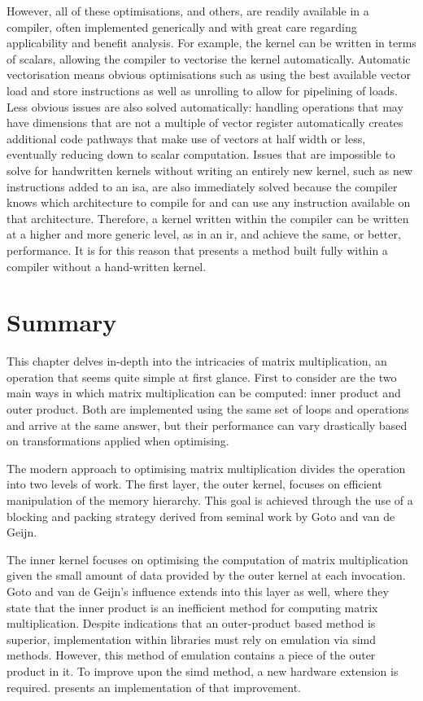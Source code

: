 \documentclass[\main/thesis.tex]{subfiles}
\begin{document}
However, all of these optimisations, and others, are readily available in a compiler, often implemented generically and with great care regarding applicability and benefit analysis.
For example, the kernel can be written in terms of scalars, allowing the compiler to vectorise the kernel automatically.
Automatic vectorisation means obvious optimisations such as using the best available vector load and store instructions as well as unrolling to allow for pipelining of loads.
Less obvious issues are also solved automatically: handling operations that may have dimensions that are not a multiple of vector register automatically creates additional code pathways that make use of vectors at half width or less, eventually reducing down to scalar computation.
Issues that are impossible to solve for handwritten kernels without writing an entirely new kernel, such as new instructions added to an \gls{isa}, are also immediately solved because the compiler knows which architecture to compile for and can use any instruction available on that architecture.
Therefore, a kernel written within the compiler can be written at a higher and more generic level, as in an \gls{ir}, and achieve the same, or better, performance.
It is for this reason that  presents a method built fully within a compiler without a hand-written kernel.

\section{Summary}
This chapter delves in-depth into the intricacies of matrix multiplication, an operation that seems quite simple at first glance.
First to consider are the two main ways in which matrix multiplication can be computed: inner product and outer product.
Both are implemented using the same set of loops and operations and arrive at the same answer, but their performance can vary drastically based on transformations applied when optimising.

The modern approach to optimising matrix multiplication divides the operation into two levels of work.
The first layer, the outer kernel, focuses on efficient manipulation of the memory hierarchy.
This goal is achieved through the use of a blocking and packing strategy derived from seminal work by Goto and van de Geijn.

The inner kernel focuses on optimising the computation of matrix multiplication given the small amount of data provided by the outer kernel at each invocation.
Goto and van de Geijn's influence extends into this layer as well, where they state that the inner product is an inefficient method for computing matrix multiplication.
Despite indications that an outer-product based method is superior, implementation within libraries must rely on emulation via \gls{simd} methods.
However, this method of emulation contains a piece of the outer product in it.
To improve upon the \gls{simd} method, a new hardware extension is required.
 presents an implementation of that improvement.
\end{document}
